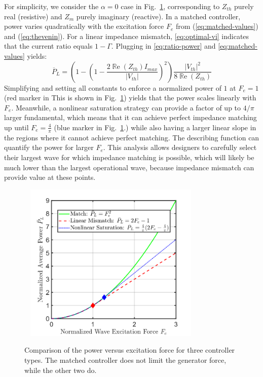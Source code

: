 \documentclass{ifacconf}
\renewcommand{\Re}{\operatorname{\mathbb{R}e}}
\begin{document}
For simplicity, we consider the $\alpha=0$ case in Fig.~\ref{fig:sensitivity}, corresponding to $Z_{th}$ purely real (resistive) and $Z_m$ purely imaginary (reactive). In a matched controller, power varies quadratically with the excitation force $F_e$ from (\ref{eq:matched-values}) and (\ref{eq:thevenin}). For a linear impedance mismatch, \eqref{eq:optimal-vi} indicates that the current ratio equals $1 - \Gamma$. Plugging in \eqref{eq:ratio-power} and \eqref{eq:matched-values} yields:
\begin{equation}
    \overline{P}_L = \left( 1 - \left(1 - \frac{2 \Re(Z_{th}) I_{max}}{|V_{th}|}\right)^2 \right) \frac{|V_{th}|^2}{8 \Re(Z_{th})}
\end{equation}
Simplifying and setting all constants to enforce a normalized power of $1$ at $F_e=1$ (red marker in This is shown in Fig.~\ref{fig:sensitivity}) yields that the power scales linearly with $F_e$. Meanwhile, a nonlinear saturation strategy can provide a factor of up to $4/\pi$ larger fundamental, which means that it can achieve perfect impedance matching up until $F_e=\frac{4}{\pi}$ (blue marker in Fig.~\ref{fig:sensitivity}.) while also having a larger linear slope in the regions where it cannot achieve perfect matching. The describing function can quantify the power for larger $F_e$. This analysis allows designers to carefully select their largest wave for which impedance matching is possible, which will likely be much lower than the largest operational wave, because impedance mismatch can provide value at these points.
\begin{figure}[htbp!]\
    \centering
    \includegraphics[width=8.4cm]{ifacconf_latex/figs/sensitivity-plot.png}
    \caption{Comparison of the power versus excitation force for three controller types. The matched controller does not limit the generator force, while the other two do.}
    \label{fig:sensitivity}
\end{figure}
\end{document}
